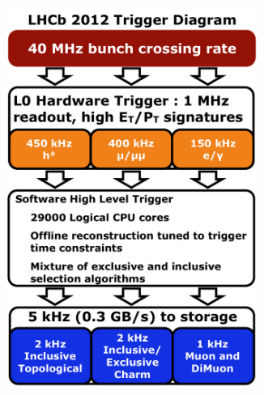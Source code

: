 \begin{figure}[!tb]
\begin{subfigure}{0.49\textwidth}
\includegraphics[width=0.9\textwidth]{figs/detector/trigger-run1.pdf}
\caption{}
\label{fig:trigger:run1}
\end{subfigure}
\begin{subfigure}{0.49\textwidth}

\end{subfigure}
\end{figure}
